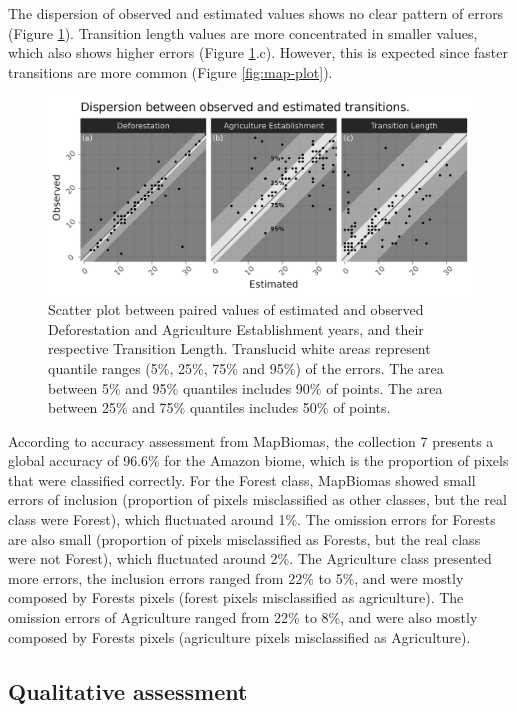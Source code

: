 \documentclass[essd, manuscript]{copernicus}
\begin{document}
The dispersion of observed and estimated values shows no clear pattern of errors (Figure \ref{fig:errorscatter-plot}).
Transition length values are more concentrated in smaller values, which also shows higher errors (Figure \ref{fig:errorscatter-plot}.c).
However, this is expected since faster transitions are more common (Figure \ref{fig:map-plot}).

\begin{figure}[ht]
\includegraphics[width=17cm]{figs/error_scatter} \caption{Scatter plot between paired values of estimated and observed Deforestation and Agriculture Establishment years, and their respective Transition Length. Translucid white areas represent quantile ranges (5\%, 25\%, 75\% and 95\%) of the errors. The area between 5\% and 95\% quantiles includes 90\% of points. The area between 25\% and 75\% quantiles includes 50\% of points.}\label{fig:errorscatter-plot}
\end{figure}

According to accuracy assessment from MapBiomas, the collection 7 presents a global accuracy of 96.6\% for the Amazon biome, which is the proportion of pixels that were classified correctly.
For the Forest class, MapBiomas showed small errors of inclusion (proportion of pixels misclassified as other classes, but the real class were Forest), which fluctuated around 1\%.
The omission errors for Forests are also small (proportion of pixels misclassified as Forests, but the real class were not Forest), which fluctuated around 2\%.
The Agriculture class presented more errors, the inclusion errors ranged from 22\% to 5\%, and were mostly composed by Forests pixels (forest pixels misclassified as agriculture).
The omission errors of Agriculture ranged from 22\% to 8\%, and were also mostly composed by Forests pixels (agriculture pixels misclassified as Agriculture).

\subsection{Qualitative assessment}
\end{document}
